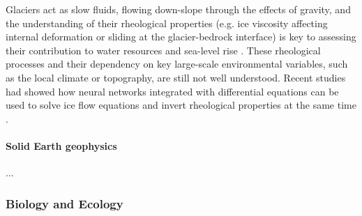 Glaciers act as slow fluids, flowing down-slope through the effects of gravity, and the understanding of their rheological properties (e.g. ice viscosity affecting internal deformation or sliding at the glacier-bedrock interface) is key to assessing their contribution to water resources and sea-level rise \cite{cuffey_physics_2010}. 
These rheological processes and their dependency on key large-scale environmental variables, such as the local climate or topography, are still not well understood.
Recent studies had showed how neural networks integrated with differential equations can be used to solve ice flow equations\cite{Jouvet_Cordonnier_Kim_Lüthi_Vieli_Aschwanden_2021, Jouvet_2022} and invert rheological properties at the same time \cite{bolibar_universal_2023, wang2022discovering}.  

\paragraph{Solid Earth geophysics}
...

\subsubsection{Biology and Ecology}


